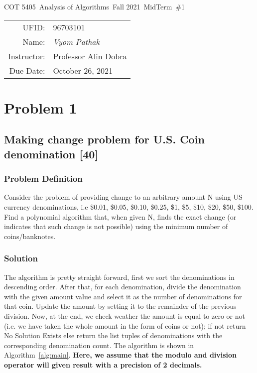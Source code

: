 \documentclass{article}
\newcommand{\hmwkTitle}{MidTerm\ \#1}
\newcommand{\hmwkDueDate}{October 26, 2021}
\newcommand{\hmwkClassCode}{COT 5405}
\newcommand{\hmwkClass}{Analysis of Algorithms}
\newcommand{\hmwkClassYear}{Fall 2021}
\newcommand{\hmwkClassInstructor}{Professor Alin Dobra}
\newcommand{\hmwkAuthorName}{\textit{Vyom Pathak}}
\newcommand{\hmwkUFID}{96703101}
\begin{document}
\begin{center}
{\Large \hmwkClassCode\ \hmwkClass\ \hmwkClassYear\ \hmwkTitle}

\begin{tabular}{rl}
UFID: & \hmwkUFID \\
Name: & \hmwkAuthorName \\
Instructor: & \hmwkClassInstructor \\
Due Date: & \hmwkDueDate \\ 
\end{tabular}
\end{center}

\section*{Problem 1}
\subsection*{Making change problem for U.S. Coin denomination [40]}
\subsubsection{Problem Definition}
Consider the problem of providing change to an arbitrary amount N using US currency denominations, i.e \$0.01, \$0.05, \$0.10, \$0.25, \$1, \$5, \$10, \$20, \$50, \$100. Find a polynomial algorithm that, when given N, finds the exact change (or indicates that such change is not possible) using the minimum number of coins/banknotes.
\subsubsection*{Solution}
The algorithm is pretty straight forward, first we sort the denominations in descending order. After that, for each denomination, divide the denomination with the given amount value and select it as the number of denominations for that coin. Update the amount by setting it to the remainder of the previous division. Now, at the end, we check weather the amount is equal to zero or not (i.e. we have taken the whole amount in the form of coins or not); if not return No Solution Exists else return the list tuples of denominations with the corresponding denomination count. The algorithm is shown in Algorithm~\ref{alg:main}.
\textbf{Here, we assume that the modulo and division operator will given result with a precision of 2 decimals.}\\
\end{document}
